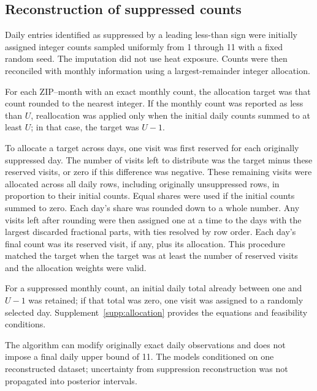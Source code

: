 \documentclass[11pt,letterpaper]{article}
\begin{document}
\subsection{Reconstruction of suppressed counts}
Daily entries identified as suppressed by a leading less-than sign were initially assigned integer counts sampled uniformly from 1 through 11 with a fixed random seed. The imputation did not use heat exposure. Counts were then reconciled with monthly information using a largest-remainder integer allocation.

For each ZIP--month with an exact monthly count, the allocation target was that count rounded to the nearest integer. If the monthly count was reported as less than \(U\), reallocation was applied only when the initial daily counts summed to at least \(U\); in that case, the target was \(U-1\).

To allocate a target across days, one visit was first reserved for each originally suppressed day. The number of visits left to distribute was the target minus these reserved visits, or zero if this difference was negative. These remaining visits were allocated across all daily rows, including originally unsuppressed rows, in proportion to their initial counts. Equal shares were used if the initial counts summed to zero. Each day's share was rounded down to a whole number. Any visits left after rounding were then assigned one at a time to the days with the largest discarded fractional parts, with ties resolved by row order. Each day's final count was its reserved visit, if any, plus its allocation. This procedure matched the target when the target was at least the number of reserved visits and the allocation weights were valid.

For a suppressed monthly count, an initial daily total already between one and \(U-1\) was retained; if that total was zero, one visit was assigned to a randomly selected day. Supplement~\ref{supp:allocation} provides the equations and feasibility conditions.

The algorithm can modify originally exact daily observations and does not impose a final daily upper bound of 11. The models conditioned on one reconstructed dataset; uncertainty from suppression reconstruction was not propagated into posterior intervals.
\end{document}
